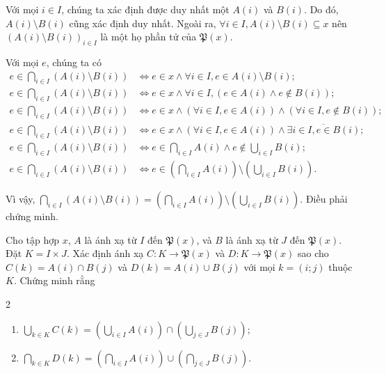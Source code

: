 \stepSubexercise Với mọi $i \in I$, chúng ta xác định được duy nhất một $A(i)$ và $B(i)$. Do đó, $A(i) \setminus B(i)$ cũng xác định duy nhất. Ngoài ra, $\forall i \in I, A(i) \setminus B(i) \subseteq x$ nên $\left(A(i) \setminus B(i)\right)_{i \in I}$ là một họ phần tử của $\mathfrak{P}(x)$.

Với mọi $e$, chúng ta có
\begin{align*}
   e \in \bigcap_{i \in I}\left(A(i) \setminus B(i)\right) &\iff e \in x \land \forall i \in I, e \in A(i) \setminus B(i); \\
   e \in \bigcap_{i \in I}\left(A(i) \setminus B(i)\right) &\iff e \in x \land \forall i \in I, (e \in A(i) \land e \notin B(i)); \\
   e \in \bigcap_{i \in I}\left(A(i) \setminus B(i)\right) &\iff e \in x \land (\forall i \in I, e \in A(i)) \land (\forall i \in I, e \notin B(i));\\
   e \in \bigcap_{i \in I}\left(A(i) \setminus B(i)\right) &\iff e \in x \land (\forall i \in I, e \in A(i)) \land \overline{\exists i \in I, e \in B(i)};\\
   e \in \bigcap_{i \in I}\left(A(i) \setminus B(i)\right) &\iff e \in \bigcap_{i \in I}A(i) \land e  \notin \bigcup_{i \in I}B(i);\\
   e \in \bigcap_{i \in I}\left(A(i) \setminus B(i)\right) &\iff e  \in \left(\bigcap_{i \in I}A(i)\right) \setminus \left(\bigcup_{i \in I}B(i)\right).
\end{align*}

Vì vậy, $\bigcap_{i \in I}\left(A(i) \setminus B(i)\right) = \left(\bigcap_{i \in I}A(i)\right) \setminus \left(\bigcup_{i \in I}B(i)\right)$. Điều phải chứng minh.

\exercise Cho tập hợp $x$, $A$ là ánh xạ từ $I$ đến $\mathfrak{P}(x)$, và $B$ là ánh xạ từ $J$ đến $\mathfrak{P}(x)$. Đặt $K = I \times J$. Xác định ánh xạ $C : K \to \mathfrak{P}(x)$ và $D : K \to \mathfrak{P}(x)$ sao cho $C(k) = A(i) \cap B(j)$ và $D(k) = A(i) \cup B(j)$ với mọi $k = (i; j)$ thuộc $K$. Chứng minh rằng
\begin{multicols}{2}
   \begin{enumerate}
      \item $\bigcup_{k \in K}C(k) = \left(\bigcup_{i \in I}A(i)\right) \cap \left(\bigcup_{j \in J}B(j)\right)$;
      \item $\bigcap_{k \in K}D(k) = \left(\bigcap_{i \in I}A(i)\right) \cup \left(\bigcap_{j \in J}B(j)\right)$.
   \end{enumerate}
\end{multicols} 

